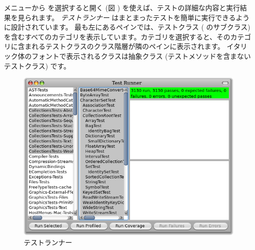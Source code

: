 \documentclass[a4paper,10pt,twoside]{book}
\begin{document}
 メニューから  を選択すると開く \sunit {} (図 ) を使えば、テストの詳細な内容と実行結果を見られます。
\emph{テストランナー} はまとまったテストを簡単に実行できるように設計されています。
最も左にあるペインでは、テストクラス (\ie {} のサブクラス) を含むすべてのカテゴリを表示しています。カテゴリを選択すると、そのカテゴリに含まれるテストクラスのクラス階層が隣のペインに表示されます。
イタリック体のフォントで表示されるクラスは抽象クラス (テストメソッドを含まないテストクラス) です。


\begin{figure}[tbh]
  \begin{center}
	\includegraphics[width=\linewidth]{test-runner}
	\caption{\pharo \sunit テストランナー}
  \end{center}
\end{figure}



\end{document}
